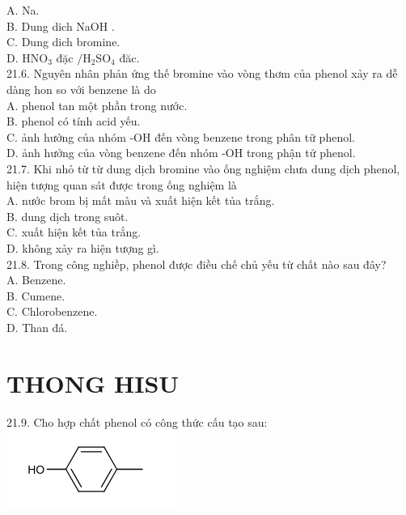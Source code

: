 \documentclass[10pt]{article}
\begin{document}
A. Na.\\
B. Dung dich NaOH .\\
C. Dung dich bromine.\\
D. $\mathrm{HNO}_{3}$ đặc $/ \mathrm{H}_{2} \mathrm{SO}_{4}$ đăc.\\
21.6. Nguyên nhân phản ứng thế bromine vào vòng thơm của phenol xảy ra dễ dàng hon so với benzene là do\\
A. phenol tan một phần trong nước.\\
B. phenol có tính acid yếu.\\
C. ảnh hưởng của nhóm -OH đến vòng benzene trong phân tữ phenol.\\
D. ảnh hưởng của vòng benzene đến nhóm -OH trong phận tử phenol.\\
21.7. Khi nhỏ từ từ dung dịch bromine vào ống nghiệm chưa dung dịch phenol, hiện tượng quan sát được trong ống nghiệm là\\
A. nước brom bị mất màu và xuất hiện kết tủa trắng.\\
B. dung dịch trong suôt.\\
C. xuất hiện kết tủa trắng.\\
D. không xảy ra hiện tượng gì.\\
21.8. Trong công nghiềp, phenol được điều chế chủ yếu từ chất nào sau đây?\\
A. Benzene.\\
B. Cumene.\\
C. Chlorobenzene.\\
D. Than đá.

\section*{THONG HISU}
21.9. Cho hợp chất phenol có công thức cấu tạo sau:\\
\includegraphics{smile-bda674f18e893e4449b65cdf5ade68e2df646f10}
\end{document}
